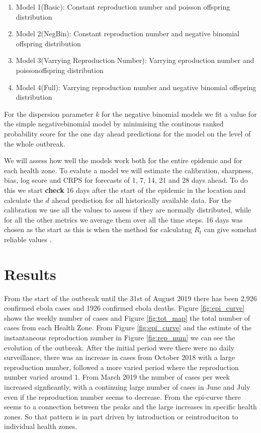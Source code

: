 \documentclass[12pt]{article}
\begin{document}
\begin{enumerate}
\item{Model 1(Basic): Constant reproduction number and poisson offspring distribution}
\item{Model 2(NegBin): Constant reproduction number and negative binomial offspring distribution}
\item{Model 3(Varrying Reproduction Number): Varrying eproduction number and poissonoffspring distribution}
\item{Model 4(Full): Varrying reproduction number and negative binomial offspring distribution}
\end{enumerate}

For the dispersion parameter $k$ for the negative binomial models we fit a value for the simple negativebinomial model by minimising the continous ranked probability score for the one day ahead predictions for the model on the level of the whole outbreak. 

We will assess how well the models work both for the entire epidemic and for each health zone. To evalute a model we will estimate the calibration, sharpness, bias, log score and CRPS for forecasts of 1, 7, 14, 21 and 28 days ahead. To do this we start { \bf check } 16 days after the start of the epidemic in the location and calculate the $d$ ahead prediction for all historically available data. For the calibration we use all the values to assess if they are normally distributed, while for all the other metrics we average them over all the time steps. 16 days was chosen as the start as this is when the method for calculatng $R_t$ can give somehat reliable values \cite{coriNewFrameworkSoftware2013}. 



\section{Results}
From the start of the outbreak until the 31st of August 2019 there has been 2,926 confirmed ebola cases and 1926 confirmed ebola deaths. Figure \ref{fig:epi_curve} shows the weekly number of cases and Figure \ref{fig:tot_map} the total number of cases from each Health Zone. From Figure \ref{fig:epi_curve} and the estimte of the instantaneous reproduction number in Figure \ref{fig:rep_num} we can see the evolution of the outbreak. After the initial period were there were no daily surveillance, there was an increase in cases from October 2018 with a large reproduction number, followed a more varied period where the reproduction number varied around 1. From March 2019 the number of cases per week increased signficantly, with a continuing large number of cases in June and July even if the reproduction number seems to decrease. From the epi-curve there seems to a connection between the peaks and the large increases in specific health zones. So that pattern is in part driven by introduction or reintroduciton to individual health zones. 
\end{document}
